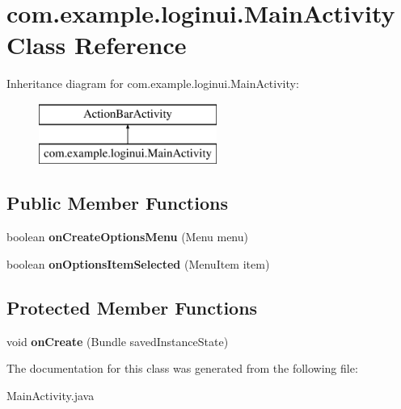 \hypertarget{classcom_1_1example_1_1loginui_1_1_main_activity}{\section{com.\+example.\+loginui.\+Main\+Activity Class Reference}
\label{classcom_1_1example_1_1loginui_1_1_main_activity}
}
Inheritance diagram for com.\+example.\+loginui.\+Main\+Activity\+:\begin{figure}[H]
\begin{center}
\leavevmode
\includegraphics[height=2.000000cm]{classcom_1_1example_1_1loginui_1_1_main_activity}
\end{center}
\end{figure}
\subsection*{Public Member Functions}
\begin{DoxyCompactItemize}
\item 
\hypertarget{classcom_1_1example_1_1loginui_1_1_main_activity_a02ed137deadc6ab361e90e204a756289}{boolean {\bfseries on\+Create\+Options\+Menu} (Menu menu)}\label{classcom_1_1example_1_1loginui_1_1_main_activity_a02ed137deadc6ab361e90e204a756289}

\item 
\hypertarget{classcom_1_1example_1_1loginui_1_1_main_activity_af835cd50ce1bb4bd929a212858f127af}{boolean {\bfseries on\+Options\+Item\+Selected} (Menu\+Item item)}\label{classcom_1_1example_1_1loginui_1_1_main_activity_af835cd50ce1bb4bd929a212858f127af}

\end{DoxyCompactItemize}
\subsection*{Protected Member Functions}
\begin{DoxyCompactItemize}
\item 
\hypertarget{classcom_1_1example_1_1loginui_1_1_main_activity_a1a579a5991445835cfdfa723e874702a}{void {\bfseries on\+Create} (Bundle saved\+Instance\+State)}\label{classcom_1_1example_1_1loginui_1_1_main_activity_a1a579a5991445835cfdfa723e874702a}

\end{DoxyCompactItemize}


The documentation for this class was generated from the following file\+:\begin{DoxyCompactItemize}
\item 
Main\+Activity.\+java\end{DoxyCompactItemize}
